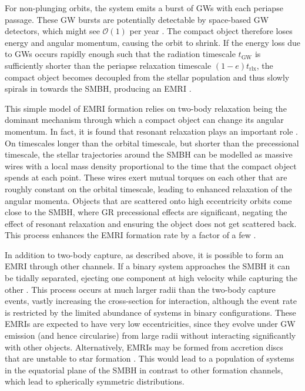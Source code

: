 For non-plunging orbits, the system emits a burst of GWs with each periapse passage. These GW bursts are potentially detectable by space-based GW detectors, which might see $\mathcal{O}(1)$ per year \citep{berry_expectations_2013}. The compact object therefore loses energy and angular momentum, causing the orbit to shrink.  If the energy loss due to GWs occurs rapidly enough such that the radiation timescale $t_\mathrm{GW}$ is sufficiently shorter than the periapse relaxation timescale $(1-e)t_\mathrm{rlx}$, the compact object becomes decoupled from the stellar population and thus slowly spirals in towards the SMBH, producing an EMRI \citep{merritt_stellar_2011}.

This simple model of EMRI formation relies on two-body relaxation being the dominant mechanism through which a compact object can change its angular momentum. In fact, it is found that resonant relaxation \citep{rauch_resonant_1996} plays an important role \citep{hopman_resonant_2006}. On timescales longer than the orbital timescale, but shorter than the precessional timescale, the stellar trajectories around the SMBH can be modelled as massive wires with a local mass density proportional to the time that the compact object spends at each point. These wires exert mutual torques on each other that are roughly constant on the orbital timescale, leading to enhanced relaxation of the angular momenta. Objects that are scattered onto high eccentricity orbits come close to the SMBH, where GR precessional effects are significant, negating the effect of resonant relaxation and ensuring the object does not get scattered back. This process enhances the EMRI formation rate by a factor of a few \citep{hopman_resonant_2006}.

In addition to two-body capture, as described above, it is possible to form an EMRI through other channels. If a binary system approaches the SMBH it can be tidally separated, ejecting one component at high velocity while capturing the other \citep{miller_binary_2005}. This process occurs at much larger radii than the two-body capture events, vastly increasing the cross-section for interaction, although the event rate is restricted by the limited abundance of systems in binary configurations. These EMRIs are expected to have very low eccentricities, since they evolve under GW emission (and hence circularise) from large radii without interacting significantly with other objects. Alternatively, EMRIs may be formed from accretion discs that are unstable to star formation \citep{levin_starbursts_2007}. This would lead to a population of systems in the equatorial plane of the SMBH in contrast to other formation channels, which lead to spherically symmetric distributions.


